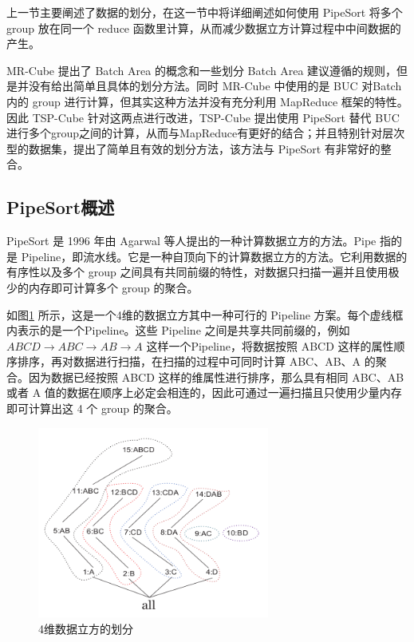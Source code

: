 上一节主要阐述了数据的划分，在这一节中将详细阐述如何使用 PipeSort 将多个 group 放在同一个 reduce 函数里计算，从而减少数据立方计算过程中中间数据的产生。 

MR-Cube 提出了 Batch Area 的概念和一些划分 Batch Area 建议遵循的规则，但是并没有给出简单且具体的划分方法。同时 MR-Cube 中使用的是 BUC 对Batch 内的 group 进行计算，但其实这种方法并没有充分利用 MapReduce 框架的特性。因此 TSP-Cube 针对这两点进行改进，TSP-Cube 提出使用 PipeSort 替代 BUC 进行多个group之间的计算，从而与MapReduce有更好的结合；并且特别针对层次型的数据集，提出了简单且有效的划分方法，该方法与 PipeSort 有非常好的整合。

\subsection{PipeSort概述}

PipeSort\cite{agarwal1996computation} 是 1996 年由 Agarwal 等人提出的一种计算数据立方的方法。Pipe 指的是 Pipeline，即流水线。它是一种自顶向下的计算数据立方的方法。它利用数据的有序性以及多个 group 之间具有共同前缀的特性，对数据只扫描一遍并且使用极少的内存即可计算多个 group 的聚合。

如图\ref{pipesort} 所示，这是一个4维的数据立方其中一种可行的 Pipeline 方案。每个虚线框内表示的是一个Pipeline。这些 Pipeline 之间是共享共同前缀的，例如 $ABCD\rightarrow ABC\rightarrow AB\rightarrow A$ 这样一个Pipeline，将数据按照 ABCD 这样的属性顺序排序，再对数据进行扫描，在扫描的过程中可同时计算 ABC、AB、A 的聚合。因为数据已经按照 ABCD 这样的维属性进行排序，那么具有相同 ABC、AB 或者 A 值的数据在顺序上必定会相连的，因此可通过一遍扫描且只使用少量内存即可计算出这 4 个 group 的聚合。

\begin{figure}[!htb]
\centering\includegraphics[width=3in]{picture/ch_terasort_mr/pipesort} 
\caption{4维数据立方的划分}\label{pipesort} 
\end{figure} 

